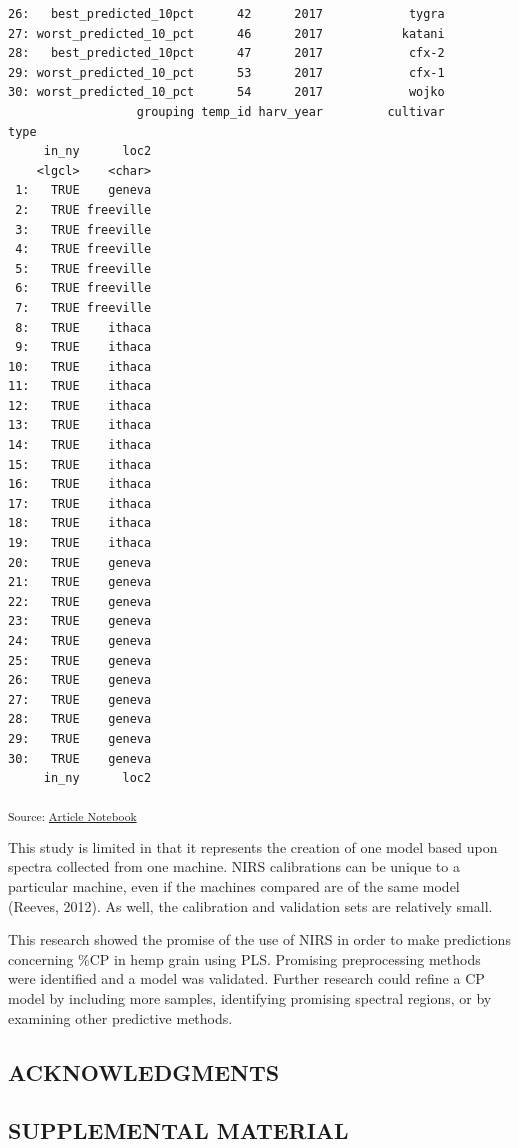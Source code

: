 \documentclass[
]{agujournal2019}
\begin{document}
\begin{verbatim}
26:   best_predicted_10pct      42      2017            tygra             
27: worst_predicted_10_pct      46      2017           katani             
28:   best_predicted_10pct      47      2017            cfx-2             
29: worst_predicted_10_pct      53      2017            cfx-1             
30: worst_predicted_10_pct      54      2017            wojko             
                  grouping temp_id harv_year         cultivar         type
     in_ny      loc2
    <lgcl>    <char>
 1:   TRUE    geneva
 2:   TRUE freeville
 3:   TRUE freeville
 4:   TRUE freeville
 5:   TRUE freeville
 6:   TRUE freeville
 7:   TRUE freeville
 8:   TRUE    ithaca
 9:   TRUE    ithaca
10:   TRUE    ithaca
11:   TRUE    ithaca
12:   TRUE    ithaca
13:   TRUE    ithaca
14:   TRUE    ithaca
15:   TRUE    ithaca
16:   TRUE    ithaca
17:   TRUE    ithaca
18:   TRUE    ithaca
19:   TRUE    ithaca
20:   TRUE    geneva
21:   TRUE    geneva
22:   TRUE    geneva
23:   TRUE    geneva
24:   TRUE    geneva
25:   TRUE    geneva
26:   TRUE    geneva
27:   TRUE    geneva
28:   TRUE    geneva
29:   TRUE    geneva
30:   TRUE    geneva
     in_ny      loc2
\end{verbatim}

\textsubscript{Source:
\href{https://rvcrawford.github.io/glowing-system/index.qmd.html}{Article
Notebook}}

This study is limited in that it represents the creation of one model
based upon spectra collected from one machine. NIRS calibrations can be
unique to a particular machine, even if the machines compared are of the
same model (Reeves, 2012). As well, the calibration and validation sets
are relatively small.

This research showed the promise of the use of NIRS in order to make
predictions concerning \%CP in hemp grain using PLS. Promising
preprocessing methods were identified and a model was validated. Further
research could refine a CP model by including more samples, identifying
promising spectral regions, or by examining other predictive methods.

\subsection{ACKNOWLEDGMENTS}\label{acknowledgments}

\subsection{SUPPLEMENTAL MATERIAL}\label{supplemental-material}
\end{document}
